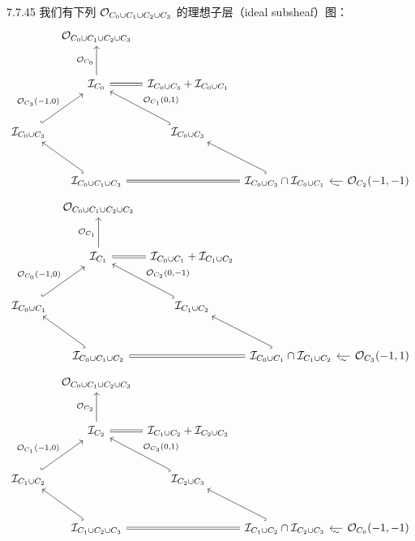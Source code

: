 \begin{exam}{7.7.45}\label{exam:a4-7-7-45}
我们有下列 $\mathcal{O}_{C_0\cup C_1\cup C_2\cup C_3}$ 的理想子层（ideal subsheaf）图：
{\small
\[
\begin{tikzcd}[column sep=tiny,row sep=large]
 & \OO_{C_0\cup C_1\cup C_2\cup C_3} & & \\
 & \mathcal I_{C_0}\arrow[u,"\OO_{C_0}"]\arrow[r,equal,no head] & \mathcal I_{C_0\cup C_3}+\mathcal I_{C_0\cup C_1} & \\
 \mathcal I_{C_0\cup C_3}\arrow[ur,hook,"{\OO_{C_3}(-1,0)}"] & & \mathcal I_{C_0\cup C_3}\arrow[ul,hook,"{\OO_{C_1}(0,1)}"'] & \\
 & \mathcal I_{C_0\cup C_1\cup C_3}\arrow[ul,hook]\arrow[rr,equal,no head] & & \mathcal I_{C_0\cup C_3}\cap\mathcal I_{C_0\cup C_1}\arrow[ul,hook] & & \OO_{C_2}(-1,-1)\arrow[ll,"\sim"]
\end{tikzcd}
\]}
{\small
\[
\begin{tikzcd}[column sep=tiny,row sep=large]
 & \OO_{C_0\cup C_1\cup C_2\cup C_3} & & \\
 & \mathcal I_{C_1}\arrow[u,"\OO_{C_1}"]\arrow[r,equal,no head] & \mathcal I_{C_0\cup C_1}+\mathcal I_{C_1\cup C_2} & \\
 \mathcal I_{C_0\cup C_1}\arrow[ur,hook,"{\OO_{C_0}(-1,0)}"] & & \mathcal I_{C_1\cup C_2}\arrow[ul,hook,"{\OO_{C_2}(0,-1)}"'] & \\
 & \mathcal I_{C_0\cup C_1\cup C_2}\arrow[ul,hook]\arrow[rr,equal,no head] & & \mathcal I_{C_0\cup C_1}\cap\mathcal I_{C_1\cup C_2}\arrow[ul,hook] & & \OO_{C_3}(-1,1)\arrow[ll,"\sim"]
\end{tikzcd}
\]}
{\small
\[
\begin{tikzcd}[column sep=tiny,row sep=large]
 & \OO_{C_0\cup C_1\cup C_2\cup C_3} & & \\
 & \mathcal I_{C_2}\arrow[u,"\OO_{C_2}"]\arrow[r,equal,no head] & \mathcal I_{C_1\cup C_2}+\mathcal I_{C_2\cup C_3} & \\
 \mathcal I_{C_1\cup C_2}\arrow[ur,hook,"{\OO_{C_1}(-1,0)}"] & & \mathcal I_{C_2\cup C_3}\arrow[ul,hook,"{\OO_{C_3}(0,1)}"'] & \\
 & \mathcal I_{C_1\cup C_2\cup C_3}\arrow[ul,hook]\arrow[rr,equal,no head] & & \mathcal I_{C_1\cup C_2}\cap\mathcal I_{C_2\cup C_3}\arrow[ul,hook] & & \OO_{C_0}(-1,-1)\arrow[ll,"\sim"]

\end{tikzcd}\]}
\end{exam}
